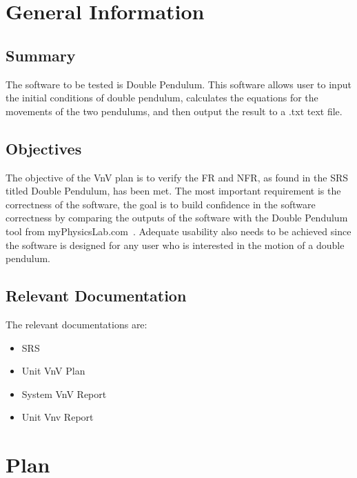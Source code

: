 \documentclass[12pt, titlepage]{article}
\begin{document}
\section{General Information}\label{sec_generalInfo}

\subsection{Summary}

The software to be tested is Double Pendulum. This software allows user to input
the initial conditions of double pendulum, calculates the equations for the
movements of the two pendulums, and then output the result to a .txt text file.

\subsection{Objectives} \label{objective}

The objective of the VnV plan is to verify the FR and NFR, as found in the SRS
titled Double Pendulum, has been met. The most important requirement is the
correctness of the software, the goal is to build confidence in the software
correctness by comparing the outputs of the software with the Double Pendulum
tool from myPhysicsLab.com~\cite{Double_Pendulum}. Adequate usability also needs
to be achieved since the software is designed for any user who is interested in
the motion of a double pendulum.
 
\subsection{Relevant Documentation}

The relevant documentations are:
\begin{itemize}
    \item SRS ~\cite{SRS}
    \item Unit VnV Plan ~\cite{UnitVnV}
    \item System VnV Report~\cite{SystemVnVReport}
    \item Unit Vnv Report~\cite{UnitVnVReport}
\end{itemize}


\section{Plan}\label{sec_Plan}
	
\end{document}
